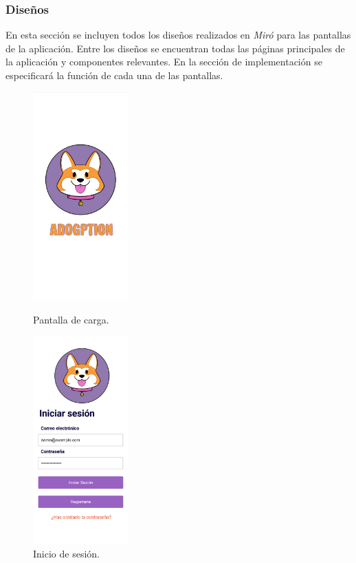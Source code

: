 \documentclass[a4paper, 12pt]{article}
\begin{document}
\newpage
\subsubsection{Diseños}

En esta sección se incluyen todos los diseños realizados en \textit{Miró} para las pantallas de la aplicación. Entre los diseños se encuentran todas las páginas principales de la aplicación y componentes relevantes. En la sección de implementación se especificará la función de cada una de las pantallas.


\begin{figure}[H]
   	\begin{minipage}{0.48\textwidth}
		\begin{center}
			{\includegraphics[height=8cm]{design/SplashScreen.jpg}\par}
			\caption{Pantalla de carga.}
			\medskip
		\end{center}  
	\end{minipage}\hfill
   	\begin{minipage}{0.48\textwidth}
		\begin{center}
			{\includegraphics[height=8cm]{design/Login.jpg}\par}
			\caption{Inicio de sesión.}
			\medskip
		\end{center}  
	\end{minipage}\hfill
\end{figure}
\end{document}

